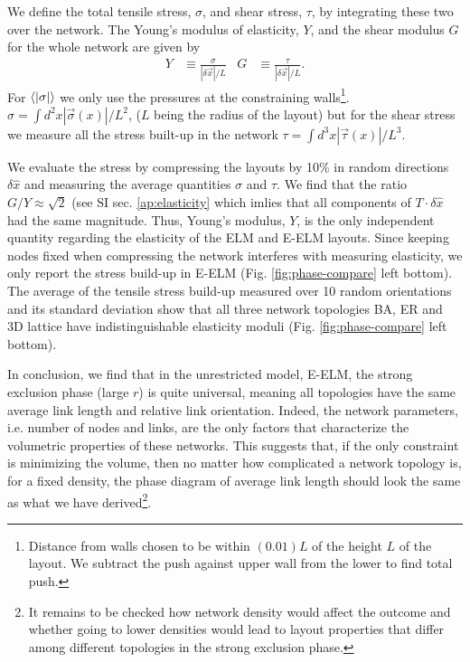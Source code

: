 \documentclass[nofootinbib,preprint,floatfix]{revtex4} %
\begin{document}
We define the total tensile stress, $\sigma$, and shear stress, $\tau$, by integrating these two over the network. %
The Young's modulus of elasticity, $Y$, and the shear modulus $G$ for the whole network  are given by 
\begin{align}
    Y &\equiv \frac{\sigma}{ |\delta \vec{x}|/L} &
    G &\equiv \frac{\tau}{ |\delta \vec{x}|/L} 
    \label{eq:YG}.
\end{align}
For $\be{|\sigma|}$ we only use the pressures at the constraining walls\footnote{Distance from walls chosen to be within $(0.01) L$ of the height $L$ of the layout. 
We subtract the push against upper wall from the lower to find total push. }.  
$\sigma = \int d^2x |\vec{\sigma}(x)|/L^2 $, ($L$ being the radius of the layout) but for the shear stress we measure all the stress built-up in the network $\tau = \int d^3 x |\vec{\tau}(x)| /L^3$. 

We evaluate the stress by compressing the layouts by 10\% in random directions $\delta \hat{x}$ and measuring the average quantities $\sigma$ and $\tau$. We find that the ratio $G/Y \approx \sqrt{2}$ (see SI sec. \ref{ap:elasticity} which imlies that all components of $T\cdot \delta\hat{x}$ had the same magnitude. 
Thus, Young's modulus, $Y$, is the only independent quantity regarding the elasticity of the ELM and E-ELM layouts. 
Since keeping nodes fixed when compressing the network interferes with measuring elasticity, we only report the stress build-up in E-ELM (Fig. \ref{fig:phase-compare} left bottom). 
The average of the tensile stress build-up measured over 10 random orientations and its standard deviation show that all three  network topologies BA, ER and 3D lattice have indistinguishable elasticity moduli (Fig. \ref{fig:phase-compare} left bottom). 


In conclusion, we find that in the unrestricted model, E-ELM, the strong exclusion phase (large $r$) is quite universal, meaning all topologies have the same average link length and relative link orientation.   
Indeed, the network parameters, i.e. number of nodes and links, are the only factors that characterize the volumetric properties of these networks. 
This suggests that, if the only constraint is minimizing the volume, then no matter how complicated a network topology is, for a fixed density, the phase diagram of average link length should look the same as what we have derived\footnote{
It remains to be checked how network density would affect the outcome and whether going to lower densities would lead to layout properties that differ among different topologies in the strong exclusion phase.}.
\end{document}
